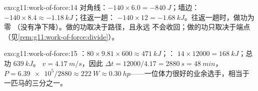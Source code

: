 \begin{solution}{exo:g11:work-of-force:14}
对角线：$-140 \times 6.0 = -\qty{840}{J}$；墙边：
$-140 \times 8.4 \approx -\qty{1.18}{kJ}$；往返一趟：
$-140 \times 12 = -\qty{1.68}{kJ}$。往返一趟时，做功为零
（没有净下降）。做的功取决于路径，且永远
不会收回；做的功只取决于端点
（见\cref{rem:g11:work-of-force:divide}）。
\end{solution}

\begin{solution}{exo:g11:work-of-force:15}
：$80 \times 9.81 \times 600 \approx \qty{471}{kJ}$；：
$14 \times 12000 = \qty{168}{kJ}$；总功 $\qty{639}{kJ}$。
$v = \qty{4.17}{m/s}$，因此 $\Delta t = 12000/4.17 = \qty{2880}{s} =
\qty{48}{min}$，$P = \num{6.39e5}/2880 \approx \qty{222}{W} \approx
\qty{0.30}{hp}$——一位体力很好的业余选手，相当于一匹马的三分之一。
\end{solution}

